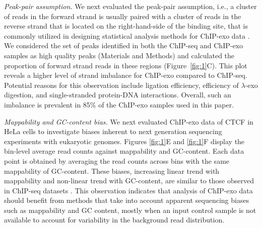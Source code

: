 \documentclass{bmcart}
\newcommand{\SK}[1]{\textcolor{red}{SK: #1}}
\newcommand{\RW}[1]{\textcolor{blue}{RW: #1}}
\begin{document}
\textit{Peak-pair assumption.} We next evaluated the peak-pair assumption, i.e., a cluster of reads in the forward strand is usually paired with a cluster of reads in the reverse strand that is located on the right-hand-side of the binding site, that is commonly utilized in designing statistical analysis methods for ChIP-exo data \cite{mace, cexor, peakzilla}. We considered the set of peaks identified in both the ChIP-seq and ChIP-exo samples as high quality peaks (Materials and Methods) and calculated the proportion of forward strand reads in these regions (Figure~\ref{fig:1}C). This plot reveals a higher level of strand imbalance for ChIP-exo compared to ChIP-seq. Potential reasons for this observation include ligation efficiency, efficiency of $\lambda$-exo digestion, and single-stranded protein-DNA interactions. Overall, such an imbalance is prevalent in 85\% of the ChIP-exo samples used in this paper.


\textit{Mappability and GC-content bias.} We next evaluated ChIP-exo data of CTCF in HeLa cells \cite{exo1} to investigate biases inherent to next generation sequencing experiments with eukaryotic genomes. Figures \ref{fig:1}E and \ref{fig:1}F display the bin-level average read counts against mappability and GC-content. Each data point is obtained by averaging the read counts across bins with the same mappability of GC-content.  These biases, increasing linear trend with mappability and non-linear trend with GC-content, are similar to those observed in ChIP-seq datasets \cite{benjamini2011,mosaics,quest}. This observation  indicates that analysis of  ChIP-exo data should benefit from methods that take into account  apparent sequencing biases such as mappability and GC content, mostly when an input  control sample is not available to account for variability in the background read distribution.


\end{document}
